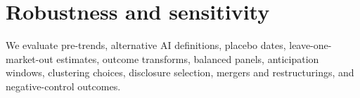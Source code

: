 \section{Robustness and sensitivity}
We evaluate pre-trends, alternative AI definitions, placebo dates, leave-one-market-out estimates, outcome transforms, balanced panels, anticipation windows, clustering choices, disclosure selection, mergers and restructurings, and negative-control outcomes.
